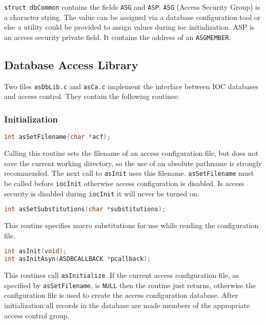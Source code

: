 \verb|struct dbCommon| contains the fields \verb|ASG| and \verb|ASP|.
\verb|ASG| (Access Security Group) is a character string.
The value can be assigned via a database configuration tool or else a utility could be provided to assign values during ioc initialization.
ASP is an access security private field.
It contains the address of an \verb|ASGMEMBER|.

\subsection{Database Access Library}

Two files \verb|asDbLib.c| and \verb|asCa.c| implement the interface between IOC databases and access control.
They contain the following routines:

\subsubsection{Initialization}

\begin{lstlisting}[language=C]
int asSetFilename(char *acf);
\end{lstlisting}

Calling this routine sets the filename of an access configuration file, but does not save the current working directory, so the use of an absolute pathname is strongly recommended.
The next call to \verb|asInit| uses this filename.
\verb|asSetFilename| must be called before \verb|iocInit| otherwise access configuration is disabled.
Is access security is disabled during \verb|iocInit| it will never be turned on.

\begin{lstlisting}[language=C]
int asSetSubstitutions(char *substitutions);
\end{lstlisting}

This routine specifies macro substitutions for use while reading the configuration file.

\begin{lstlisting}[language=C]
int asInit(void);
int asInitAsyn(ASDBCALLBACK *pcallback);
\end{lstlisting}

This routines call \verb|asInitialize|.
If the current access configuration file, as specified by \verb|asSetFilename|, is \verb|NULL| then the routine just returns, otherwise the configuration file is used to create the access configuration database.
After initialization all records in the database are made members of the appropriate access control group.

